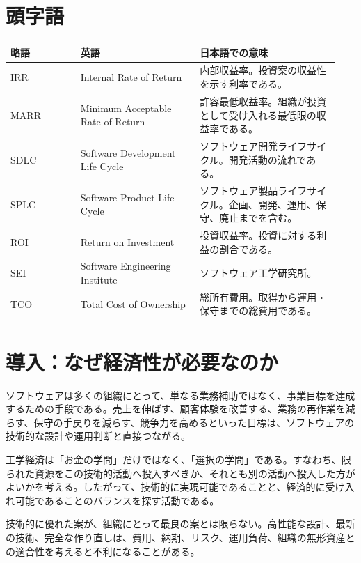 \documentclass[a4paper,11pt]{article}
\begin{document}
\section*{頭字語}
\begin{longtable}{L{0.20\linewidth} L{0.34\linewidth} L{0.40\linewidth}}
\toprule
\textbf{略語} & \textbf{英語} & \textbf{日本語での意味} \\
\midrule
IRR & Internal Rate of Return & 内部収益率。投資案の収益性を示す利率である。 \\
MARR & Minimum Acceptable Rate of Return & 許容最低収益率。組織が投資として受け入れる最低限の収益率である。 \\
SDLC & Software Development Life Cycle & ソフトウェア開発ライフサイクル。開発活動の流れである。 \\
SPLC & Software Product Life Cycle & ソフトウェア製品ライフサイクル。企画、開発、運用、保守、廃止までを含む。 \\
ROI & Return on Investment & 投資収益率。投資に対する利益の割合である。 \\
SEI & Software Engineering Institute & ソフトウェア工学研究所。 \\
TCO & Total Cost of Ownership & 総所有費用。取得から運用・保守までの総費用である。 \\
\bottomrule
\end{longtable}

\section{導入：なぜ経済性が必要なのか}

ソフトウェアは多くの組織にとって、単なる業務補助ではなく、事業目標を達成するための手段である。売上を伸ばす、顧客体験を改善する、業務の再作業を減らす、保守の手戻りを減らす、競争力を高めるといった目標は、ソフトウェアの技術的な設計や運用判断と直接つながる。

工学経済は「お金の学問」だけではなく、「選択の学問」である。すなわち、限られた資源をこの技術的活動へ投入すべきか、それとも別の活動へ投入した方がよいかを考える。したがって、技術的に実現可能であることと、経済的に受け入れ可能であることのバランスを探す活動である。

\begin{importantbox}
技術的に優れた案が、組織にとって最良の案とは限らない。高性能な設計、最新の技術、完全な作り直しは、費用、納期、リスク、運用負荷、組織の無形資産との適合性を考えると不利になることがある。
\end{importantbox}
\end{document}
